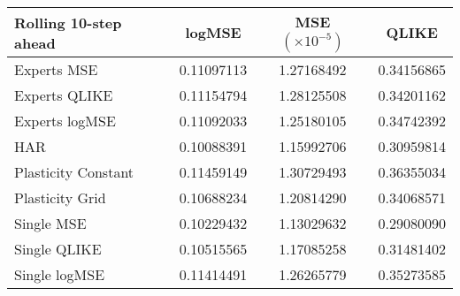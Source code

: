 
\begin{tabular}{l|c|c|c}
Rolling 10-step ahead     & logMSE & MSE $(\times 10^{-5})$ & QLIKE \\\hline
Experts MSE & 0.11097113 & 1.27168492 & 0.34156865\\ 
Experts QLIKE & 0.11154794 & 1.28125508 & 0.34201162\\ 
Experts logMSE & 0.11092033 & 1.25180105 & 0.34742392\\ 
HAR & 0.10088391 & 1.15992706 & 0.30959814\\ 
Plasticity Constant & 0.11459149 & 1.30729493 & 0.36355034\\ 
Plasticity Grid & 0.10688234 & 1.20814290 & 0.34068571\\ 
Single MSE & 0.10229432 & 1.13029632 & 0.29080090\\ 
Single QLIKE & 0.10515565 & 1.17085258 & 0.31481402\\ 
Single logMSE & 0.11414491 & 1.26265779 & 0.35273585\\ 
\end{tabular}